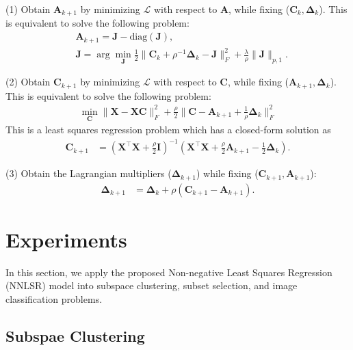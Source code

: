 \documentclass[10pt,twocolumn,letterpaper]{article}
\begin{document}
(1) Obtain $\bm{A}_{k+1}$ by minimizing $\mathcal{L}$ with respect to $\bm{A}$, while fixing ($\bm{C}_{k},\bm{\Delta}_{k}$). This is equivalent to solve the following problem:
\begin{equation}
\begin{split}
\label{e8}
&
\bm{A}_{k+1}
=
\bm{J}-\text{diag}(\bm{J}),
\\
&
\bm{J}
=
\arg\min_{\bm{J}}
\frac{1}{2}
\|
\bm{C}_{k}
+
\rho^{-1}\bm{\Delta}_{k}
-
\bm{J}
\|_{F}^{2}
+
\frac{\lambda}{\rho}
\|
\bm{J}
\|_{p,1}.
\end{split}
\end{equation}

(2) Obtain $\bm{C}_{k+1}$ by minimizing $\mathcal{L}$ with respect to $\bm{C}$, while fixing ($\bm{A}_{k+1},\bm{\Delta}_{k}$). This is equivalent to solve the following problem:
\begin{equation}
\begin{split}
\label{e6}
\min_{\bm{C}}
\|
\bm{X}-\bm{X}\bm{C}
\|_{F}^{2}
+
\frac{\rho}{2}
\|
\bm{C}-\bm{A}_{k+1}+\frac{1}{\rho}\bm{\Delta}_{k}
\|_{F}^{2}
\end{split}
\end{equation}
This is a least squares regression problem which has a closed-form solution as 
\begin{equation}
\begin{split}
\label{e7}
\bm{C}_{k+1} 
&
=
(\bm{X}^{\top}\bm{X}+\frac{\rho}{2}\bm{I})^{-1}
(\bm{X}^{\top}\bm{X}+\frac{\rho}{2}\bm{A}_{k+1}-\frac{1}{2}\bm{\Delta}_{k})
.
\end{split}
\end{equation}

(3) Obtain the Lagrangian multipliers ($\bm{\Delta}_{k+1}$) while fixing ($\bm{C}_{k+1},\bm{A}_{k+1}$):
\begin{equation}
\begin{split}
\label{e10}
\bm{\Delta}_{k+1}
&
=
\bm{\Delta}_{k}
+
\rho
(\bm{C}_{k+1}-\bm{A}_{k+1})
.
\end{split}
\end{equation}


\section{Experiments}

In this section, we apply the proposed Non-negative Least Squares Regression (NNLSR) model into subspace clustering, subset selection, and image classification problems.


\subsection{Subspae Clustering}
\end{document}
